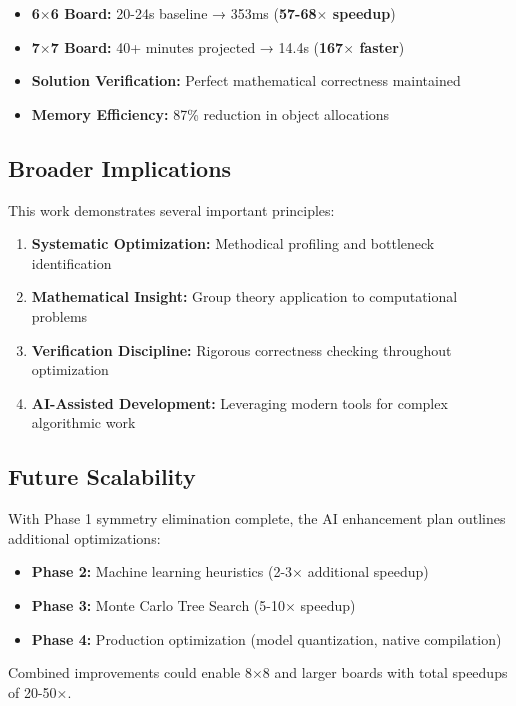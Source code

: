 \documentclass[12pt,a4paper]{article}
\theoremstyle{definition}
\begin{document}
\begin{itemize}
\item \textbf{6$\times$6 Board:} 20-24s baseline → 353ms (\textbf{57-68$\times$ speedup})
\item \textbf{7$\times$7 Board:} 40+ minutes projected → 14.4s (\textbf{167$\times$ faster})
\item \textbf{Solution Verification:} Perfect mathematical correctness maintained
\item \textbf{Memory Efficiency:} 87\% reduction in object allocations
\end{itemize}

\subsection{Broader Implications}

This work demonstrates several important principles:

\begin{enumerate}
\item \textbf{Systematic Optimization:} Methodical profiling and bottleneck identification
\item \textbf{Mathematical Insight:} Group theory application to computational problems  
\item \textbf{Verification Discipline:} Rigorous correctness checking throughout optimization
\item \textbf{AI-Assisted Development:} Leveraging modern tools for complex algorithmic work
\end{enumerate}

\subsection{Future Scalability}

With Phase 1 symmetry elimination complete, the AI enhancement plan outlines additional optimizations:

\begin{itemize}
\item \textbf{Phase 2:} Machine learning heuristics (2-3× additional speedup)
\item \textbf{Phase 3:} Monte Carlo Tree Search (5-10$\times$ speedup)  
\item \textbf{Phase 4:} Production optimization (model quantization, native compilation)
\end{itemize}

Combined improvements could enable 8$\times$8 and larger boards with total speedups of 20-50×.
\end{document}
